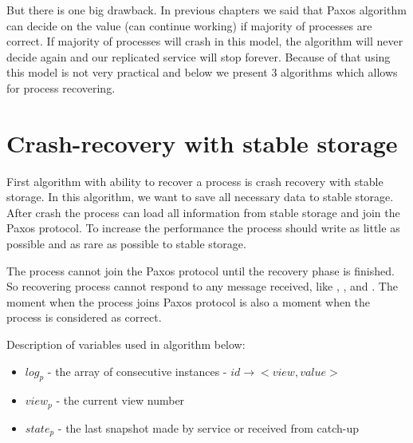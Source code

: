 But there is one big drawback. In previous chapters we said that Paxos algorithm can decide on the value (can continue working) if majority of processes are correct. If majority of processes will crash in this model, the algorithm will never decide again and our replicated service will stop forever. Because of that using this model is not very practical and below we present 3 algorithms which allows for process recovering.

\section{Crash-recovery with stable storage}
\label{sec:full_ss}

First algorithm with ability to recover a process is crash recovery with stable storage. In this algorithm, we want to save all necessary data to stable storage. After crash the process can load all information from stable storage and join the Paxos protocol. To increase the performance the process should write as little as possible and as rare as possible to stable storage.

The process cannot join the Paxos protocol until the recovery phase is finished. So recovering process cannot respond to any message received, like \propose, \accept, \prepare and \prepareOK. The moment when the process joins Paxos protocol is also a moment when the process is considered as correct.

Description of variables used in algorithm below:
\begin{itemize}
  \item $log_p$ - the array of consecutive instances - $id \rightarrow <view, value>$
  \item $view_p$ - the current view number
  \item $state_p$ - the last snapshot made by service or received from catch-up
\end{itemize}

